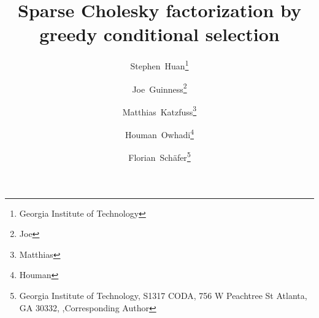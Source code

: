 \makeatletter
\newcommand*{\subalign}[1]{%
  \vcenter{%
    \Let@ \restore@math@cr \default@tag
    \baselineskip\fontdimen10 \scriptfont\tw@
    \advance\baselineskip\fontdimen12 \scriptfont\tw@
    \lineskip\thr@@\fontdimen8 \scriptfont\thr@@
    \lineskiplimit\lineskip
    \ialign{\hfil$\m@th\scriptstyle##$&$\m@th\scriptstyle{}##$\hfil\crcr
      #1\crcr
    }%
  }%
}
\makeatother

\renewcommand*{\algorithmicrequire}{\textbf{Input:}}
\renewcommand*{\algorithmicensure}{\textbf{Output:}}

\newcommand*{\creflastconjunction}{, and~}



\title{Sparse Cholesky factorization by greedy conditional selection}

\author{
  Stephen\ Huan\thanks{Georgia Institute of Technology} \and
  Joe\ Guinness\thanks{Joe} \and
  Matthias\ Katzfuss\thanks{Matthias} \and
  Houman\ Owhadi\thanks{Houman} \and
  Florian\ Sch{\"a}fer\thanks{Georgia Institute of Technology,
  S1317 CODA, 756 W Peachtree St Atlanta, GA 30332, \newline
  ,\newline Corresponding Author}
}

\newcommand*{\defeq}{\coloneqq}
\newcommand*{\BigO}{\mathcal{O}}
\newcommand*{\N}{\mathcal{N}}
\newcommand*{\SpSet}{\mathcal{S}}
\newcommand*{\GP}{\mathcal{GP}}
\newcommand*{\Loss}{\mathcal{L}}
\newcommand*{\Order}{\mathcal{I}}
\newcommand*{\Reverse}{\updownarrow}
\newcommand*{\I}{I}
\newcommand*{\J}{J}
\newcommand*{\V}{V}

\renewcommand*{\vec}[1]{\bm{#1}}
\newcommand*{\Id}{\text{Id}}

\newcommand*{\CM}{\Theta}
\newcommand*{\mean}{\mu}
\newcommand*{\var}{\sigma^2}
\newcommand*{\std}{\sigma}
\newcommand*{\K}{K}
\newcommand*{\Train}{\text{Tr}}
\newcommand*{\Pred}{\text{Pr}}

